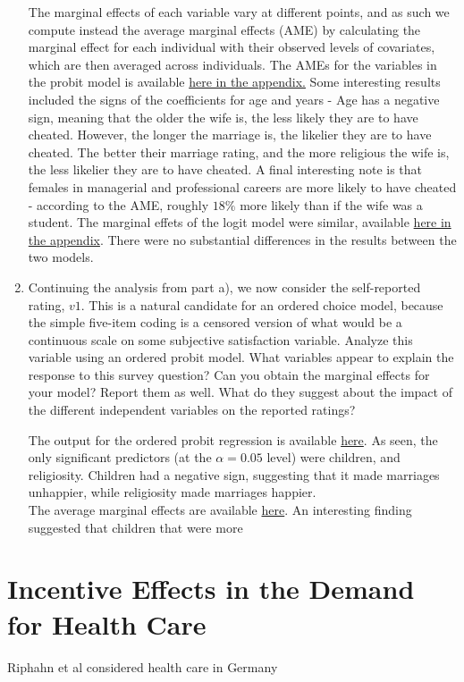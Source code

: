 \documentclass{article}
\begin{document}
\begin{enumerate}[label=(\alph*)]
The marginal effects of each variable vary at different points, and as such we compute instead the average marginal effects (AME) by calculating the marginal effect for each individual with their observed levels of covariates, which are then averaged across individuals. The AMEs for the variables in the probit model is available \hyperlink{probitame}{here in the appendix.} Some interesting results included the signs of the coefficients for age and years - Age has a negative sign, meaning that the older the wife is, the less likely they are to have cheated. However, the longer the marriage is, the likelier they are to have cheated. The better their marriage rating, and the more religious the wife is, the less likelier they are to have cheated. A final interesting note is that females in managerial and professional careers are more likely to have cheated - according to the AME, roughly $18\%$ more likely than if the wife was a student. The marginal effets of the logit model were similar, available \hyperlink{logitame}{here in the appendix}. There were no substantial differences in the results between the two models.

\newpage
\item Continuing the analysis from part a), we now consider the self-reported rating, $v1$. This is a natural candidate for an ordered choice model, because the simple five-item coding is a censored version of what would be a continuous scale on some subjective satisfaction variable. Analyze this variable using an ordered probit model. What variables appear to explain the response to this survey question? Can you obtain the marginal effects for your model? Report them as well. What do they suggest about the impact of the different independent variables on the reported ratings?

The output for the ordered probit regression is available \hyperlink{oprobit}{here}. As seen, the only significant predictors (at the $\alpha = 0.05$ level) were children, and religiosity. Children had a negative sign, suggesting that it made marriages unhappier, while religiosity made marriages happier.\\

The average marginal effects are available \hyperlink{oprobitame}{here}. An interesting finding suggested that children that were more 


 

\end{enumerate}


\newpage
\section{Incentive Effects in the Demand for Health Care}
Riphahn et al considered health care in Germany \cite{riphahn2003incentive}
\end{document}
